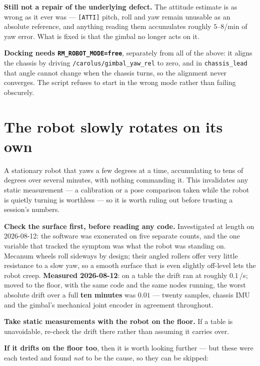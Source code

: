 \documentclass[11pt]{report}
\begin{document}
\textbf{Still not a repair of the underlying defect.} The attitude estimate is
as wrong as it ever was --- \texttt{[ATTI]} pitch, roll and yaw remain unusable
as an absolute reference, and anything reading them accumulates roughly
$5$--$8$\textdegree/min of yaw error. What is fixed is that the gimbal no
longer acts on it.

\textbf{Docking needs \texttt{RM\_ROBOT\_MODE=free}}, separately from all of
the above: it aligns the chassis by driving \texttt{/carolus/gimbal\_yaw\_rel}
to zero, and in \texttt{chassis\_lead} that angle cannot change when the
chassis turns, so the alignment never converges. The script refuses to start
in the wrong mode rather than failing obscurely.

\section{The robot slowly rotates on its own}
\label{sec:uncommanded-yaw}

A stationary robot that yaws a few degrees at a time, accumulating to tens of
degrees over several minutes, with nothing commanding it. This invalidates
any static measurement --- a calibration or a pose comparison taken while the
robot is quietly turning is worthless --- so it is worth ruling out before
trusting a session's numbers.

\textbf{Check the surface first, before reading any code.} Investigated at
length on 2026-08-12: the software was exonerated on five separate counts,
and the one variable that tracked the symptom was what the robot was standing
on. Mecanum wheels roll sideways by design; their angled rollers offer very
little resistance to a slow yaw, so a smooth surface that is even slightly
off-level lets the robot creep. \textbf{Measured 2026-08-12}: on a table the drift ran at
roughly $0.1$\,\textdegree/s; moved to the floor, with the same code and the
same nodes running, the worst absolute drift over a full \textbf{ten
minutes} was $0.01$\textdegree{} --- twenty samples, chassis IMU and the
gimbal's mechanical joint encoder in agreement throughout.

\textbf{Take static measurements with the robot on the floor.} If a table is
unavoidable, re-check the drift there rather than assuming it carries over.

\textbf{If it drifts on the floor too}, then it is worth looking further --- but
these were each tested and found \emph{not} to be the cause, so they can be
skipped:
\end{document}
